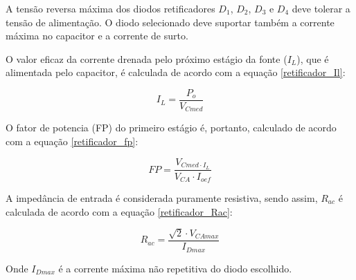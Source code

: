 \begin{apendicesenv}
A tensão reversa máxima dos diodos retificadores $D_{1}$, $D_{2}$, $D_{3}$ e $D_{4}$ deve tolerar a tensão de alimentação. O diodo selecionado deve suportar também a corrente máxima no capacitor e a corrente de surto.

O valor eficaz da corrente drenada pelo próximo estágio da fonte ($I_{L}$), que é alimentada pelo capacitor, é calculada de acordo com a equação \ref{retificador_Il}:

    \begin{equation}
        I_{L} = \frac{P_{o}}{V_{Cmed}}
        \label{retificador_Il}
    \end{equation}

O fator de potencia (FP) do primeiro estágio é, portanto, calculado de acordo com a equação \ref{retificador_fp}:

    \begin{equation}
        FP = \frac{V_{Cmed \cdot I_{L}}}{ V_{CA} \cdot I_{oef}}
        \label{retificador_fp}
    \end{equation}

A impedância de entrada é considerada puramente resistiva, sendo assim, $R_{ac}$ é calculada de acordo com a equação \ref{retificador_Rac}:

    \begin{equation}
        R_{ac} = \frac{\sqrt{2} \cdot V_{CAmax}}{I_{Dmax}}
        \label{retificador_Rac}
    \end{equation}
    
Onde $I_{Dmax}$ é a corrente máxima não repetitiva do diodo escolhido. 


\end{apendicesenv}

